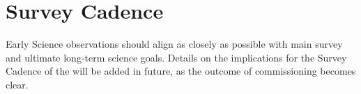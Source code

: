 \section{Survey Cadence}

Early Science observations should align as closely as possible with main survey and ultimate long-term science goals.
Details on the implications for the Survey Cadence of the \esp will be added in future, as the outcome of commissioning becomes clear.
